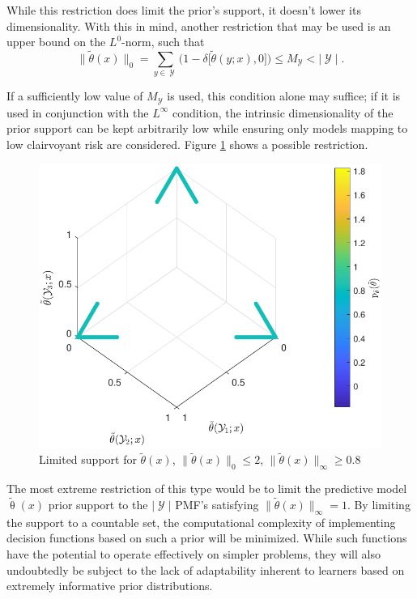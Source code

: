 \documentclass[12pt]{report}
\DeclareMathOperator{\Ycal}{\mathcal{Y}}
\begin{document}
While this restriction does limit the prior's support, it doesn't lower its dimensionality. With this in mind, another restriction that may be used is an upper bound on the $L^0$-norm, such that
\begin{equation}
\big\| \tilde{\theta}(x) \big\|_0  = \sum_{y \in \Ycal} \Big(1 - \delta\big[ \tilde{\theta}(y;x),0 \big] \Big) \leq M_{\Ycal} < |\Ycal| \;.
\end{equation}

If a sufficiently low value of $M_{\Ycal}$ is used, this condition alone may suffice; if it is used in conjunction with the $L^{\infty}$ condition, the intrinsic dimensionality of the prior support can be kept arbitrarily low while ensuring only models mapping to low clairvoyant risk are considered. Figure \ref{fig:theta_tilde_L0-inf} shows a possible restriction.
\begin{figure}
\centering
\includegraphics[width=0.6\linewidth]{theta_tilde_L0-inf.pdf}
\caption{Limited support for $\tilde{\theta}(x)$, $\big\| \tilde{\theta}(x) \big\|_0 \leq 2$, $\big\| \tilde{\theta}(x) \big\|_{\infty} \geq 0.8$}
\label{fig:theta_tilde_L0-inf}
\end{figure}

The most extreme restriction of this type would be to limit the predictive model $\tilde{\uptheta}(x)$ prior support to the $|\Ycal|$ PMF's satisfying $\big\| \tilde{\theta}(x) \big\|_{\infty} = 1$. By limiting the support to a countable set, the computational complexity of implementing decision functions based on such a prior will be minimized. While such functions have the potential to operate effectively on simpler problems, they will also undoubtedly be subject to the lack of adaptability inherent to learners based on extremely informative prior distributions. 
\end{document}
